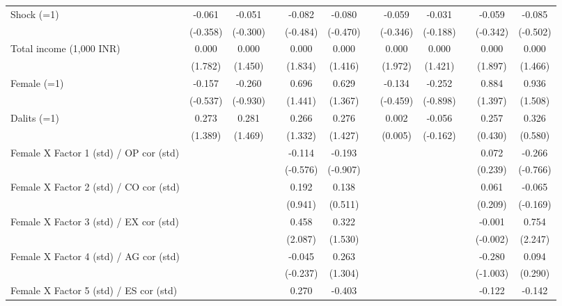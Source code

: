 {\begin{longtable}{@{\extracolsep{\fill}}lccccccccccc}
    Shock (=1) & -0.061 & -0.051 &       & -0.082 & -0.080 &       & -0.059 & -0.031 &       & -0.059 & -0.085 \\
          & (-0.358) & (-0.300) &       & (-0.484) & (-0.470) &       & (-0.346) & (-0.188) &       & (-0.342) & (-0.502) \\
    Total income (1,000 INR) & 0.000 & 0.000 &       & 0.000 & 0.000 &       & 0.000 & 0.000 &       & 0.000 & 0.000 \\
          & (1.782) & (1.450) &       & (1.834) & (1.416) &       & (1.972) & (1.421) &       & (1.897) & (1.466) \\
    Female (=1) & -0.157 & -0.260 &       & 0.696 & 0.629 &       & -0.134 & -0.252 &       & 0.884 & 0.936 \\
          & (-0.537) & (-0.930) &       & (1.441) & (1.367) &       & (-0.459) & (-0.898) &       & (1.397) & (1.508) \\
    Dalits (=1) & 0.273 & 0.281 &       & 0.266 & 0.276 &       & 0.002 & -0.056 &       & 0.257 & 0.326 \\
          & (1.389) & (1.469) &       & (1.332) & (1.427) &       & (0.005) & (-0.162) &       & (0.430) & (0.580) \\
    Female X Factor 1 (std) / OP cor (std) &       &       &       & -0.114 & -0.193 &       &       &       &       & 0.072 & -0.266 \\
          &       &       &       & (-0.576) & (-0.907) &       &       &       &       & (0.239) & (-0.766) \\
    Female X Factor 2 (std) / CO cor (std) &       &       &       & 0.192 & 0.138 &       &       &       &       & 0.061 & -0.065 \\
          &       &       &       & (0.941) & (0.511) &       &       &       &       & (0.209) & (-0.169) \\
    Female X Factor 3 (std) / EX cor (std) &       &       &       & 0.458 & 0.322 &       &       &       &       & -0.001 & 0.754 \\
          &       &       &       & (2.087) & (1.530) &       &       &       &       & (-0.002) & (2.247) \\
    Female X Factor 4 (std) / AG cor (std) &       &       &       & -0.045 & 0.263 &       &       &       &       & -0.280 & 0.094 \\
          &       &       &       & (-0.237) & (1.304) &       &       &       &       & (-1.003) & (0.290) \\
    Female X Factor 5 (std) / ES cor (std) &       &       &       & 0.270 & -0.403 &       &       &       &       & -0.122 & -0.142 \\

\end{longtable}}
